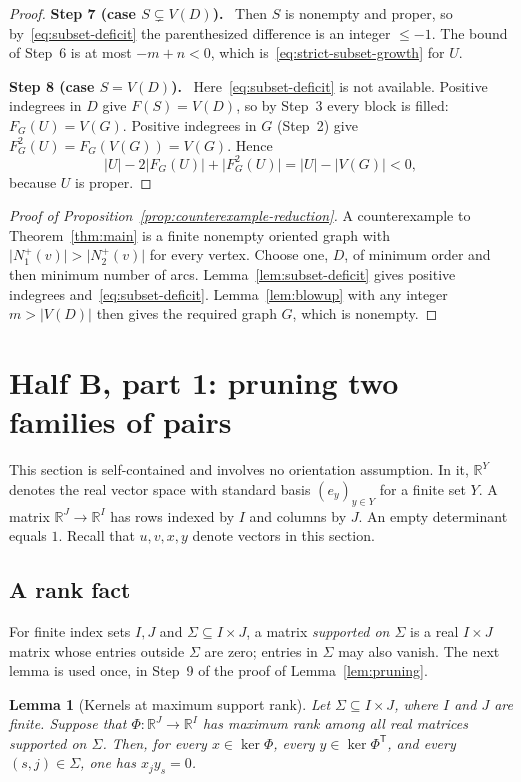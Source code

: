 \documentclass[11pt]{article}
\newtheorem{lemma}[theorem]{Lemma}
\theoremstyle{remark}
\newcommand{\abs}[1]{\lvert #1\rvert}
\newcommand{\R}{\mathbb R}
\newcommand{\step}[1]{\par\medskip\noindent\textbf{Step #1.}\ }
\begin{document}
\begin{proof}
\step{7 (case $S\subsetneq V(D)$)}
Then $S$ is nonempty and proper, so by~\eqref{eq:subset-deficit} the
parenthesized difference is an integer $\le-1$. The bound of Step~6 is at
most $-m+n<0$, which is~\eqref{eq:strict-subset-growth} for $U$.

\step{8 (case $S=V(D)$)}
Here~\eqref{eq:subset-deficit} is not available. Positive indegrees in $D$
give $F(S)=V(D)$, so by Step~3 every block is filled: $F_G(U)=V(G)$. Positive
indegrees in $G$ (Step~2) give $F_G^2(U)=F_G(V(G))=V(G)$. Hence
\[
  \abs{U}-2\abs{F_G(U)}+\abs{F_G^2(U)}
  =\abs{U}-\abs{V(G)}<0,
\]
because $U$ is proper.
\end{proof}

\begin{proof}[Proof of Proposition~\ref{prop:counterexample-reduction}]
A counterexample to Theorem~\ref{thm:main} is a finite nonempty oriented
graph with $\abs{N_1^+(v)}>\abs{N_2^+(v)}$ for every vertex. Choose one, $D$,
of minimum order and then minimum number of arcs.
Lemma~\ref{lem:subset-deficit} gives positive indegrees
and~\eqref{eq:subset-deficit}. Lemma~\ref{lem:blowup} with any integer
$m>\abs{V(D)}$ then gives the required graph $G$, which is nonempty.
\end{proof}

\section{Half B, part 1: pruning two families of pairs}\label{sec:pruning}

This section is self-contained and involves no orientation assumption. In it,
$\R^Y$ denotes the real vector space with standard basis $(e_y)_{y\in Y}$ for
a finite set $Y$. A matrix $\R^J\to\R^I$ has rows indexed by $I$ and columns
by $J$. An empty determinant equals $1$. Recall that $u,v,x,y$ denote vectors
in this section.

\subsection{A rank fact}

For finite index sets $I,J$ and $\Sigma\subseteq I\times J$, a matrix
\emph{supported on $\Sigma$} is a real $I\times J$ matrix whose entries
outside $\Sigma$ are zero; entries in $\Sigma$ may also vanish. The next lemma
is used once, in Step~9 of the proof of Lemma~\ref{lem:pruning}.

\begin{lemma}[Kernels at maximum support rank]\label{lem:kernel-support}
Let $\Sigma\subseteq I\times J$, where $I$ and $J$ are finite. Suppose that
$\Phi:\R^J\to\R^I$ has maximum rank among all real matrices supported on
$\Sigma$. Then, for every $x\in\ker \Phi$, every $y\in\ker \Phi^{\mathsf T}$,
and every $(s,j)\in \Sigma$, one has $x_jy_s=0$.
\end{lemma}
\end{document}
